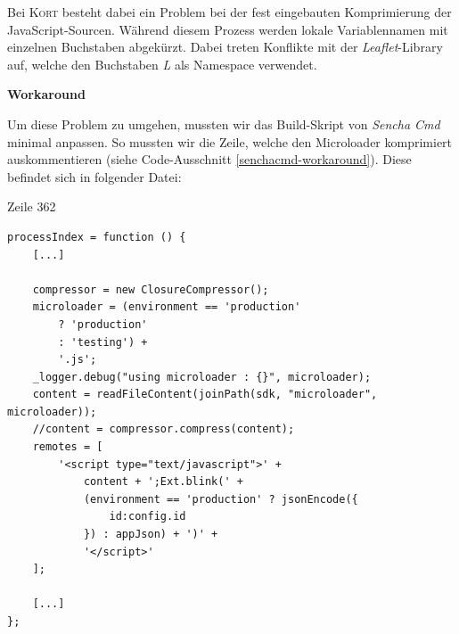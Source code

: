 Bei \textsc{Kort} besteht dabei ein Problem bei der fest eingebauten Komprimierung der JavaScript-Sourcen.
Während diesem Prozess werden lokale Variablennamen mit einzelnen Buchstaben abgekürzt.
Dabei treten Konflikte mit der \emph{Leaflet}-Library auf, welche den Buchstaben \emph{L} als Namespace verwendet.

\textbf{Workaround}

Um diese Problem zu umgehen, mussten wir das Build-Skript von \emph{Sencha Cmd} minimal anpassen.
So mussten wir die Zeile, welche den \gls{Microloader} komprimiert auskommentieren (siehe Code-Ausschnitt \ref{senchacmd-workaround}).
Diese befindet sich in folgender Datei:

 Zeile 362

\lstset{language=JavaScript}
\begin{lstlisting}[float, caption=Sencha Cmd Workaround, label=senchacmd-workaround]
processIndex = function () {
	[...]
	
	compressor = new ClosureCompressor();
	microloader = (environment == 'production'
		? 'production'
		: 'testing') +
		'.js';
	_logger.debug("using microloader : {}", microloader);
	content = readFileContent(joinPath(sdk, "microloader", microloader));
	//content = compressor.compress(content);
	remotes = [
		'<script type="text/javascript">' +
			content + ';Ext.blink(' +
			(environment == 'production' ? jsonEncode({
				id:config.id
			}) : appJson) + ')' +
			'</script>'
	];
	
	[...]
};
\end{lstlisting}